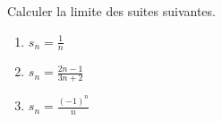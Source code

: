 

\begin{exercice}\label{exoINGE11140033}

	Calculer la limite des suites suivantes.
	\begin{enumerate}

		\item
			$s_n=\frac{1}{ n }$
		\item
			$s_n=\frac{ 2n-1 }{ 3n+2 }$
		\item
			$s_n=\frac{ (-1)^n }{ n }$

	\end{enumerate}

\end{exercice}
